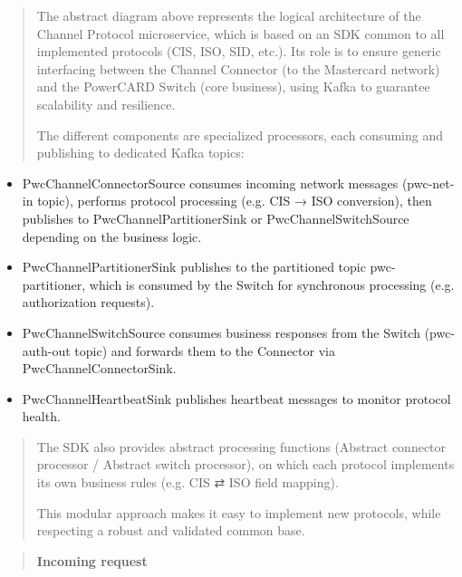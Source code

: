 \documentclass[12pt,a4paper]{report}
\begin{document}
\begin{quote}
The abstract diagram above represents the logical architecture of the
Channel Protocol microservice, which is based on an SDK common to all
implemented protocols (CIS, ISO, SID, etc.). Its role is to ensure
generic interfacing between the Channel Connector (to the Mastercard
network) and the PowerCARD Switch (core business), using Kafka to
guarantee scalability and resilience.

The different components are specialized processors, each consuming and
publishing to dedicated Kafka topics:
\end{quote}

\begin{itemize}
\item
  PwcChannelConnectorSource consumes incoming network messages
  (pwc-net-in topic), performs protocol processing (e.g. CIS → ISO
  conversion), then publishes to PwcChannelPartitionerSink or
  PwcChannelSwitchSource depending on the business logic.
\item
  PwcChannelPartitionerSink publishes to the partitioned topic
  pwc-partitioner, which is consumed by the Switch for synchronous
  processing (e.g. authorization requests).
\item
  PwcChannelSwitchSource consumes business responses from the Switch
  (pwc-auth-out topic) and forwards them to the Connector via
  PwcChannelConnectorSink.
\item
  PwcChannelHeartbeatSink publishes heartbeat messages to monitor
  protocol health.
\end{itemize}

\begin{quote}
The SDK also provides abstract processing functions (Abstract connector
processor / Abstract switch processor), on which each protocol
implements its own business rules (e.g. CIS ⇄ ISO field mapping).

This modular approach makes it easy to implement new protocols, while
respecting a robust and validated common base.
\end{quote}

\begin{quote}
\textbf{Incoming request}
\end{quote}
\end{document}
